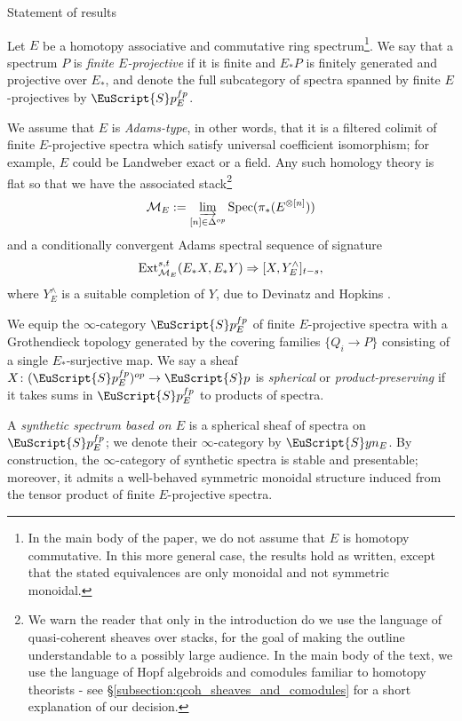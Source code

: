 \documentclass[oneside,a4paper]{amsart}
\makeatletter
\newcommand{\euscr}[1]{\EuScript{#1}} %
\newcommand{\Ext}{\textnormal{Ext}} %
\newcommand{\spectra}{\euscr{S}p} %
\newcommand{\synspectra}{\euscr{S}yn} %
\newcommand{\spectrafp}{\spectra_{E}^{fp}} %
\theoremstyle{plain}
\theoremstyle{definition}
\theoremstyle{remark}
\def\subsection{\@startsection{subsection}{1}%
  \z@{.7\linespacing\@plus\linespacing}{.5\linespacing}%
  {\normalfont\bfseries\centering}}%
\makeatother
\begin{document}
\subsection{Statement of results}

Let $E$ be a homotopy associative and commutative ring spectrum\footnote{In the main body of the paper, we do not assume that $E$ is homotopy commutative. In this more general case, the results hold as written, except that the stated equivalences are only monoidal and not symmetric monoidal.}. We say that a spectrum $P$ is \emph{finite $E$-projective} if it is finite and $E_{*}P$ is finitely generated and projective over $E_{*}$, and denote the full subcategory of spectra spanned by finite $E$-projectives by $\spectra_{E}^{fp}$. 

We assume that $E$ is \emph{Adams-type}, in other words, that it is a filtered colimit of finite $E$-projective spectra which satisfy universal coefficient isomorphism; for example, $E$ could be Landweber exact or a field. Any such homology theory is flat so that we have the associated stack\footnote{We warn the reader that only in the introduction do we use the language of quasi-coherent sheaves over stacks, for the goal of making the outline understandable to a possibly large audience. In the main body of the text, we use the language of Hopf algebroids and comodules familiar to homotopy theorists - see \S\ref{subsection:qcoh_sheaves_and_comodules} for a short explanation of our decision.}
\[
\mathcal{M}_{E} := \varinjlim_{[n] \in \Delta^{op}} \textnormal{Spec}(\pi_{*}(E^{\otimes [n]}))
\]
and a conditionally convergent Adams spectral sequence of signature 
\[
\Ext_{\mathcal{M}_{E}}^{s, t}(E_{*}X, E_{*}Y) \Rightarrow [X, Y^{\wedge}_{E}]_{t-s},
\]
where $Y^{\wedge}_{E}$ is a suitable completion of $Y$, due to Devinatz and Hopkins \cite{dev_morava}. 

We equip the $\infty$-category $\spectrafp$ of finite $E$-projective spectra with a Grothendieck topology generated by the covering families $\{ Q_{i} \rightarrow P \}$ consisting of a single $E_{*}$-surjective map. We say a sheaf $X \colon (\spectrafp)^{op} \rightarrow \spectra$ is \emph{spherical} or \emph{product-preserving} if it takes sums in $\spectrafp$ to products of spectra. 

A \emph{synthetic spectrum based on $E$} is a spherical sheaf of spectra on $\spectrafp$; we denote their $\infty$-category by $\synspectra_{E}$. By construction, the $\infty$-category of synthetic spectra is stable and presentable; moreover, it admits a well-behaved symmetric monoidal structure induced from the tensor product of finite $E$-projective spectra. 
\end{document}
